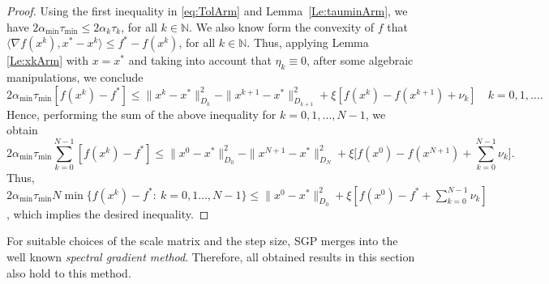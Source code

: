 \begin{proof}
	Using the first inequality in \eqref{eq:TolArm} and Lemma~\ref{Le:tauminArm}, we have $2 \alpha_{\min} \tau_{\min} \leq 2 \alpha_k \tau_k$, for all $k\in {\mathbb N}$. We also know form the convexity of $f$ that $\langle \nabla f(x^k), x^*-x^k \rangle \leq f^* - f(x^k)$, for all $k\in {\mathbb N}$. Thus, applying Lemma \ref{Le:xkArm} with $x=x^*$ {and taking into account that $\eta_k\equiv 0$},  after some algebraic manipulations, we conclude
	$$
		2 \alpha_{\min} \tau_{\min} \left[f(x^k)-f^*\right] \leq \|x^k-x^*\|_{D_k}^2-\|x^{k+1}-x^*\|_{D_{k+1}}^2 + \xi \left[f(x^k) - f(x^{k+1})+\nu_k \right] \quad k = 0, 1, \ldots.
	$$
	Hence, performing the sum of the above inequality for $k = 0,1,\ldots, N-1$, we obtain
	$$
		2 \alpha_{\min} \tau_{\min}\sum_{k=0}^{N-1} \left[f(x^k)-f^*\right] \leq \|x^0-x^*\|_{D_0}^2-\|x^{N+1}-x^*\|_{D_{N}}^2 + \xi\Big[f(x^0)-f(x^{N+1})+ \sum_{k=0}^{N-1} \nu_k\Big].
	$$
	Thus, $2\alpha_{\min} \tau_{\min} N \min\{f(x^k) - f^*:~ k = 0, 1 \ldots, N-1\} \leq \|x^0 - x^*\|^2_{D_0}+ \xi[f(x^0)-f^*+ \sum_{k=0}^{N-1} \nu_k]$, which implies the desired inequality.
\end{proof}
\begin{remark}
	For suitable choices  of the scale matrix  and the step size,  SGP merges into the well known {\it spectral gradient method}. Therefore, all obtained results in this section  also hold to this method.
\end{remark}